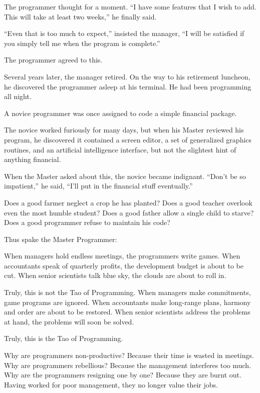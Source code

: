 The programmer thought for a moment. ``I have some features that I wish to add. This will take at least two weeks,'' he finally said.

``Even that is too much to expect,'' insisted the manager, ``I will be satisfied if you simply tell me when the program is complete.''

The programmer agreed to this.

Several years later, the manager retired. On the way to his retirement luncheon, he discovered the programmer asleep at his terminal. He had been programming all night.

A novice programmer was once assigned to code a simple financial package.

The novice worked furiously for many days, but when his Master reviewed his program, he discovered it contained a screen editor, a set of generalized graphics routines, and an artificial intelligence interface, but not the slightest hint of anything financial.

When the Master asked about this, the novice became indignant. ``Don't be so impatient,'' he said, ``I'll put in the financial stuff eventually.''

%
Does a good farmer neglect a crop he has planted?
Does a good teacher overlook even the most humble student?
Does a good father allow a single child to starve?
Does a good programmer refuse to maintain his code?
\endverse

Thus spake the Master Programmer:

%
When managers hold endless meetings,
\quad the programmers write games.
When accountants speak of quarterly profits,
\quad the development budget is about to be cut.
When senior scientists talk blue sky,
\quad the clouds are about to roll in.
\endverse

Truly, this is not the Tao of Programming.
\startverse%
When managers make commitments,
\quad game programs are ignored.
When accountants make long-range plans,
\quad harmony and order are about to be restored.
When senior scientists address the problems at hand,
\quad the problems will soon be solved.
\endverse

Truly, this is the Tao of Programming.

%
Why are programmers non-productive?
\quad Because their time is wasted in meetings.
Why are programmers rebellious?
\quad Because the management interferes too much.
Why are the programmers resigning one by one?
\quad Because they are burnt out.
Having worked for poor management,
\quad they no longer value their jobs.
\endverse

